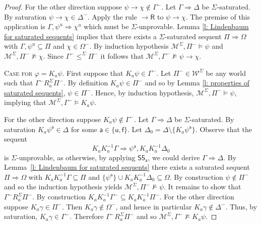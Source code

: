 \documentclass{myifcolog}
\newcommand{\K}{K}
\newcommand{\agi}{a}
\newcommand{\fw}{\mathcal{M}}
\newcommand{\f}{\mathsf{f}}
\renewcommand{\u}{\mathsf{u}}
\newcommand{\W}{\mathcal{W}}
\newcommand{\an}{\mathsf{a}}
\numberwithin{theorem}{section}
\begin{document}
\begin{proof}
    For the other direction suppose $\psi \rightarrow \chi \not \in \Gamma^-$. Let $\Gamma \Rightarrow \Delta$ be $\Sigma$-saturated. By saturation $\psi \rightarrow \chi \in \Delta^-$. Apply the rule ${\rightarrow}\mathsf{R}$ to $\psi \rightarrow \chi$. The premise of this application is $\Gamma, \psi^u \Rightarrow \chi^u$ which must be $\Sigma$-unprovable. Lemma \ref{l: Lindenbaum for saturated sequents} implies that there exists a $\Sigma$-saturated sequent $\Pi \Rightarrow \Omega$ with $\Gamma, \psi^u \subseteq \Pi$ and $\chi \in \Omega^-$. By induction hypothesis $\fw^\Sigma, \Pi^- \models \psi$ and ${\fw^\Sigma, \Pi^- \not \models \chi}$.  Since $\Gamma^- \leq^\Sigma \Pi^-$ it follows that $\fw^\Sigma, \Gamma^- \not \models \psi \rightarrow \chi$.  \smallskip
    
    \noindent \textsc{Case for $\varphi = \K_\agi \psi$.} First suppose that $\K_\agi \psi \in \Gamma^-$. Let $\Pi^- \in \W^\Sigma$ be any world such that $\Gamma^- \mathrel{R^\Sigma_\agi} \Pi^-$. By definition $\K_\agi \psi \in \Pi^-$ and so by Lemma \ref{l: properties of saturated sequents}, $\psi \in \Pi^-$. Hence, by induction hypothesis, $\fw^\Sigma, \Pi^- \models \psi$, implying that $\fw^\Sigma, \Gamma^- \models \K_\agi \psi$.
    
    For the other direction suppose $\K_\agi \psi \not \in \Gamma^-$. Let $\Gamma \Rightarrow \Delta$ be $\Sigma$-saturated. By saturation $\K_\agi\psi^\an \in \Delta$ for some $\an \in \{\u, \f \}$. Let $\Delta_0 = \Delta \setminus \{\K_\agi \psi^\an \}$. Observe that the sequent
    \begin{equation*}
        \K_\agi \K_\agi^{-1} \Gamma \Rightarrow \psi^\an, \K_\agi \K_\agi^{-1} \Delta_0
    \end{equation*}
    is $\Sigma$-unprovable, as otherwise, by applying $\mathsf{S5_\agi}$, we could derive $\Gamma \Rightarrow \Delta$. By Lemma~\ref{l: Lindenbaum for saturated sequents} there exists a saturated sequent $\Pi \Rightarrow \Omega$ with $\K_\agi\K_\agi^{-1}\Gamma \subseteq \Pi$ and $ \{\psi^\an \} \cup \K_\agi \K_\agi^{-1} \Delta_0 \subseteq \Omega$. By construction $\psi \not \in \Pi^-$ and so the induction hypothesis yields $\fw^\Sigma, \Pi^- \not \models \psi$. It remains to show that $\Gamma^- \mathrel{R_\agi^\Sigma} \Pi^-$. By construction $\K_\agi \K_\agi^{-1} \Gamma^- \subseteq \K_\agi \K_\agi^{-1} \Pi^-$. For the other direction suppose $\K_\agi \gamma \in \Pi^-$. Then $\K_\agi \gamma \not \in \Omega^-$, and hence in particular $\K_\agi \gamma \not \in \Delta^-$. Thus, by saturation, $\K_\agi \gamma \in \Gamma^-$. Therefore $\Gamma^- \mathrel{R_\agi^\Sigma} \Pi^-$ and so $\fw^\Sigma, \Gamma^- \not \models \K_\agi \psi$.\smallskip
    

\end{proof}
\end{document}
